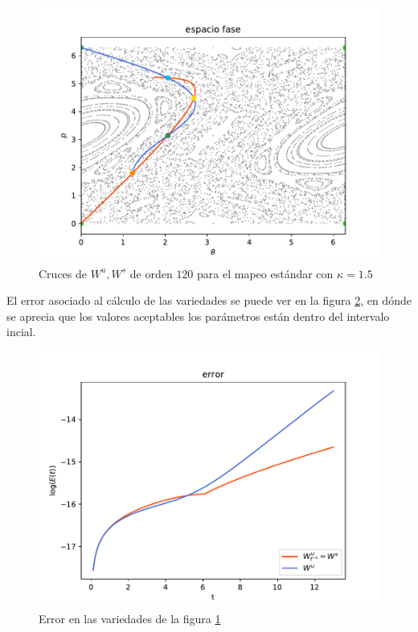 \begin{figure}[H]
\centering
\includegraphics[scale=0.6]{cruce_estandar}
\caption{Cruces de $W^{u},W^{s}$ de orden $120$ para el mapeo estándar con $\kappa=1.5$ }
\label{cruce_estandar}
\end{figure}
El error asociado al cálculo de las variedades se puede ver en la figura \ref{errorEstCruces}, en dónde se aprecia que los valores aceptables los parámetros están dentro del intervalo incial. 

\begin{figure}[H]
\centering
\includegraphics[scale=0.6]{error_cruces_estandar}
\caption{Error en las variedades de la figura \ref{cruce_estandar}}
\label{errorEstCruces}
\end{figure}


